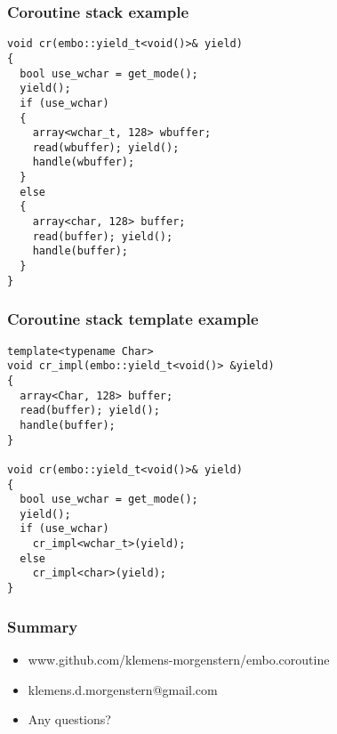 \documentclass{beamer}
\begin{document}
\begin{frame}[fragile]
\frametitle{Coroutine stack example}
\vspace*{-3ex}

\begin{block}{\vspace*{-3.2ex}}
\begin{lstlisting}[basicstyle=\small]
void cr(embo::yield_t<void()>& yield)
{
  bool use_wchar = get_mode();
  yield();
  if (use_wchar)
  {
    array<wchar_t, 128> wbuffer;
    read(wbuffer); yield();
    handle(wbuffer);
  }
  else
  {
    array<char, 128> buffer;
    read(buffer); yield();
    handle(buffer);
  }
}
\end{lstlisting}
\end{block}
\end{frame}

\begin{frame}[fragile]
\frametitle{Coroutine stack template example}
\vspace*{-3ex}
\begin{block}{\vspace*{-3.2ex}}
\begin{lstlisting}[basicstyle=\small]
template<typename Char>
void cr_impl(embo::yield_t<void()> &yield)
{
  array<Char, 128> buffer;
  read(buffer); yield();
  handle(buffer);
}

void cr(embo::yield_t<void()>& yield)
{
  bool use_wchar = get_mode();
  yield();
  if (use_wchar)
    cr_impl<wchar_t>(yield);
  else
    cr_impl<char>(yield);
}
\end{lstlisting}
\end{block}
\end{frame}

\begin{frame}
\frametitle{Summary}
\begin{itemize}
\item<1-> www.github.com/klemens-morgenstern/embo.coroutine
\item<2-> klemens.d.morgenstern@gmail.com
\item<3-> Any questions?
\end{itemize}

\end{frame}
\end{document}
